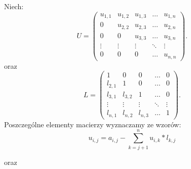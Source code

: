 \documentclass[12pt]{article}
\begin{document}
\noindent Niech:
\[U=\begin{pmatrix}
u_{1,1} & u_{1,2} & u_{1,3} & \ldots & u_{1,n} \\
0 & u_{2,2} & u_{2,3} & \ldots & u_{2,n} \\
0 & 0 & u_{3,3} & \ldots & u_{3,n} \\
\vdots & \vdots & \vdots & \ddots & \vdots \\
0 & 0 & 0 & \ldots & u_{n,n}
\end{pmatrix}.
\]
oraz 
\[L=\begin{pmatrix}
1 & 0 & 0 & \ldots & 0 \\
l_{2,1} & 1 & 0 & \ldots & 0 \\
l_{3,1} & l_{3,2} & 1 & \ldots & 0 \\
\vdots & \vdots & \vdots & \ddots & \vdots \\
l_{n,1} & l_{n,2} & l_{n,3} & \ldots & 1
\end{pmatrix}.
\]
Poszczeg\'olne elementy macierzy wyznaczamy ze wzor\'ow:
\begin{equation}
u_{i,j}=a_{i,j}-\sum_{k=j+1}^n u_{i,k}*l_{k,j} \label{U}
\end{equation}

oraz
 
\end{document}
